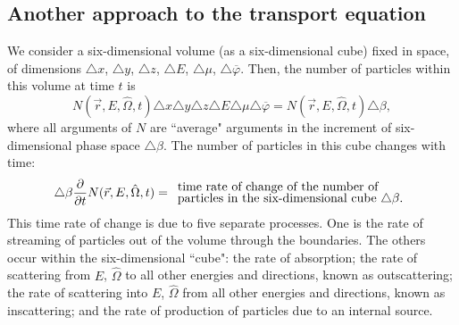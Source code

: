 \documentclass[12pt]{article}
\newcommand{\rvec}{\ensuremath{\vec{r}}}
\newcommand{\omvec}{\ensuremath{\hat{\Omega}}}
\begin{document}
\subsection*{Another approach to the transport equation}


We consider a six-dimensional volume (as a six-dimensional cube)
 fixed in space, of dimensions
$\triangle x$, $\triangle y$, $\triangle z$, $\triangle E$, $\triangle \mu$, $\triangle \overline\varphi$.
Then, the number of particles within this volume at time $t$ is
\begin{equation*}
N(\rvec,E,\omvec,t)\triangle x\triangle y\triangle z\triangle E\triangle \mu\triangle \overline\varphi =
N(\rvec,E,\omvec,t)\triangle \beta,
\end{equation*}
where all arguments of $N$ are ``average" arguments in the %
increment of six-dimensional phase space $\triangle \beta$.
The number of
particles in this cube changes with time:
\begin{equation*}
\triangle \beta\frac{\partial}{\partial t}N(\rvec,E,\omvec,t) = \begin{array}{l}
\text{time rate of change of the number of}\vspace{-0.1cm}\\
\text{particles in the six-dimensional cube $\triangle \beta$.}
\end{array}
\end{equation*}
 This time rate of change is due to five separate processes. One is the rate of streaming of
particles out of the volume through the boundaries. The others occur within the
six-dimensional ``cube": the rate
of absorption; the rate of scattering from $E$, $\omvec$ to all other energies and directions, known
as outscattering; the rate of scattering into $E$, $\omvec$ from all other energies and
 directions, known as inscattering; and the rate of production of particles due to an internal source.
\end{document}
